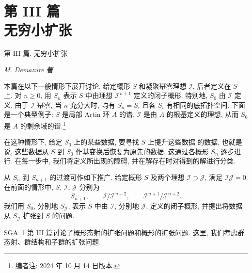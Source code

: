 
\setcounter{footnote}{-1}
\chapter*{第 III 篇\\无穷小扩张}
%
  {第 III 篇. 无穷小扩张}

\begin{center}
  \textit{M. Demazure 著}
\end{center}

本篇在以下一般情形下展开讨论. 给定概形 \(S\) 和凝聚幂零理想 \(\mathscr I\), 后者定义在 \(S\) 上. 对 \(n\geq 0\), 用 \(S_n\) 表示 \(S\) 中由理想
\(\mathscr I^{\,n+1}\) 定义的闭子概形. 特别地, \(S_0\) 由
\(\mathscr I\) 定义. 由于 \(\mathscr I\) 幂零, 当 \(n\) 充分大时,
均有 \(S_n=S\), 且各 \(S_i\) 有相同的底拓扑空间.
下面是一个典型例子: \(S\) 是局部 Artin 环 \(A\) 的谱,
\(\mathscr I\) 是由 \(A\) 的根基定义的理想, 从而 \(S_0\)
是 \(A\) 的剩余域的谱.\footnote{编者注: 2024 年 10 月 14 日版本.}

在这种情形下, 给定 \(S_0\) 上的某些数据, 要寻找 \(S\) 上提升这些数据
的数据, 也就是说, 这些数据从 \(S\) 到 \(S_0\) 作基变换后恢复为原先的数据.
这通过各概形 \(S_n\) 逐步进行. 在每一步中, 我们将定义所出现的障碍,
并在解存在时对得到的解进行分类.

从 \(S_n\) 到 \(S_{n+1}\) 的过渡可作如下推广. 给定概形 \(S\)
及两个理想 \(\mathscr I\supset\mathscr J\), 满足
\(\mathscr I\mathscr J=0\). 在前面的情形中, \(S\),
\(\mathscr I\), \(\mathscr J\) 分别为
\[
 S_{n+1},\qquad
 \mathscr I/\mathscr I^{\,n+2},\qquad
 \mathscr I^{\,n+1}/\mathscr I^{\,n+2}.
\]
我们用 \(S_0\), 分别地 \(S_{\mathscr J}\), 表示 \(S\) 中由
\(\mathscr I\), 分别地 \(\mathscr J\), 定义的闭子概形,
并提出将数据从 \(S_{\mathscr J}\) 扩张到 \(S\) 的问题.

SGA~1 第 III 篇讨论了概形态射的扩张问题和概形的扩张问题.
这里, 我们考虑群态射、群结构和子群的扩张问题.

